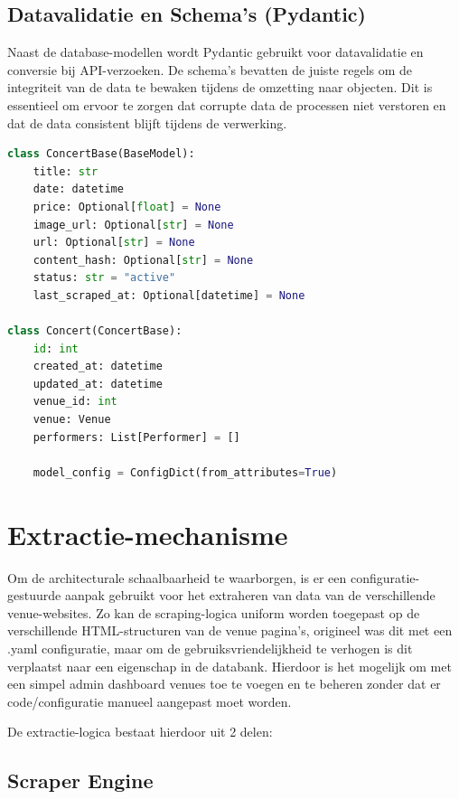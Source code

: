 \subsection{Datavalidatie en Schema's (Pydantic)}

Naast de database-modellen wordt Pydantic gebruikt voor datavalidatie en conversie bij API-verzoeken. 
De schema's bevatten de juiste regels om de integriteit van de data te bewaken tijdens de omzetting naar objecten. 
Dit is essentieel om ervoor te zorgen dat corrupte data de processen niet verstoren en dat de data consistent blijft tijdens de verwerking.

\begin{lstlisting}[language=Python,label={Concert Schema},caption={Voorbeeld van een Pydantic schema voor een concert.}]
class ConcertBase(BaseModel):
    title: str
    date: datetime
    price: Optional[float] = None
    image_url: Optional[str] = None
    url: Optional[str] = None
    content_hash: Optional[str] = None
    status: str = "active"
    last_scraped_at: Optional[datetime] = None

class Concert(ConcertBase):
    id: int
    created_at: datetime
    updated_at: datetime
    venue_id: int
    venue: Venue
    performers: List[Performer] = []

    model_config = ConfigDict(from_attributes=True)
\end{lstlisting}

\section{Extractie-mechanisme}

Om de architecturale schaalbaarheid te waarborgen, is er een configuratie-gestuurde aanpak gebruikt voor het extraheren van data van de verschillende venue-websites.
Zo kan de scraping-logica uniform worden toegepast op de verschillende HTML-structuren van de venue pagina's, origineel was dit met een .yaml configuratie, 
maar om de gebruiksvriendelijkheid te verhogen is dit verplaatst naar een eigenschap in de databank. Hierdoor is het mogelijk om met een simpel admin dashboard venues toe te voegen en te beheren zonder dat er code/configuratie manueel aangepast moet worden.

De extractie-logica bestaat hierdoor uit 2 delen:

\subsection{Scraper Engine}


